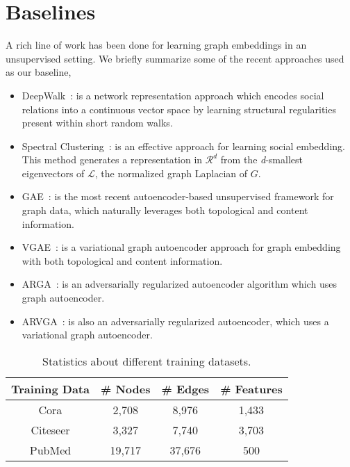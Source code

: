 \documentclass{article}
\begin{document}
\section{Baselines}
A rich line of work has been done for learning graph embeddings in an unsupervised setting. We briefly summarize some of the recent approaches used as our baseline,
\begin{itemize}
\item DeepWalk~\cite{perozzi2014deepwalk}: is a network representation
approach which encodes social relations into
a continuous vector space by learning structural regularities
present within short random walks.
\item Spectral Clustering~\cite{tang2011leveraging}: is an effective
approach for learning social embedding. This method generates a representation in $\mathcal{R}^d$ from the \textit{d}-smallest eigenvectors of $\mathcal{L}$, the normalized graph Laplacian of $G$.
\item GAE~\cite{vgae}: is the most recent
autoencoder-based unsupervised framework for graph
data, which naturally leverages both topological and
content information.
\item VGAE~\cite{vgae}: is a variational graph
autoencoder approach for graph embedding with both
topological and content information.
\item ARGA~\cite{argae}: is an adversarially regularized autoencoder
algorithm which uses graph autoencoder.
\item ARVGA~\cite{argae}: is also an adversarially regularized autoencoder, which uses a variational graph autoencoder.
\end{itemize}

\begin{table}[!h]
\centering{}
\begin{tabular}{c c c c}
  \toprule
 Training Data & \# Nodes & \# Edges & \# Features\\
  \midrule
	Cora & 2,708 & 8,976 & 1,433\\ 
	Citeseer & 3,327 & 7,740 & 3,703\\
	PubMed & 19,717 & 37,676 & 500\\
  \bottomrule
\end{tabular}
\caption{Statistics about different training datasets. \label{stats}}
\end{table}
\end{document}
